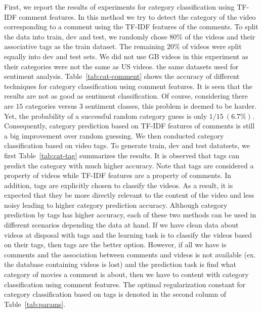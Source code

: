 First, we report the results of experiments for category classification using TF-IDF comment features. In this method we try to detect the category of the video corresponding to a comment using the TF-IDF features of the comments. To split the data into train, dev and test, we randomly chose $80\%$ of the videos and their associative tags as the train dataset. The remaining $20\%$ of videos were split equally into dev and test sets. We did not use GB videos in this experiment as their categories were not the same as US videos. the same datasets used for sentiment analysis. Table~\ref{tab:cat-comment} shows the accuracy of different techniques for category classification using comment features. It is seen that the results are not as good as sentiment classification. Of course, considering there are $15$ categories versus $3$ sentiment classes, this problem is deemed to be harder. Yet, the probability of a successful random category guess is only $1/15 \: (6.7\%)$. Consequently, category prediction based on TF-IDF features of comments is still a big improvement over random guessing.
We then conducted category classification based on video tags. To generate train, dev and test datatsets, we first Table~\ref{tab:cat-tag} summarizes the results. It is observed that tags can predict the category with much higher accuracy. Note that tags are considered a property of videos while TF-IDF features are a property of comments. In addition, tags are explicitly chosen to classify the videos. As a result, it is expected that they be more directly relevant to the content of the video and less noisy leading to higher category prediction accuracy.
Although category prediction by tags has higher accuracy, each of these two methods can be used in different scenarios depending the data at hand. If we have clean data about videos at disposal with tags and the learning task is to classify the videos based on their tags, then tags are the better option. However, if all we have is comments and the association between comments and videos is not available (ex. the database containing videos is lost) and the prediction task is find what category of movies a comment is about, then we have to content with category classification using comment features. The optimal regularization constant for category classification based on tags is denoted in the second column of Table~\ref{tab:params}.

